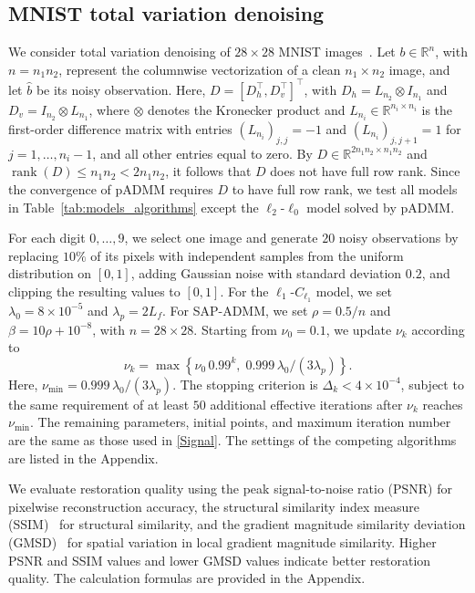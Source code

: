 \subsection{MNIST total variation denoising}

We consider total variation denoising of \(28\times28\)
MNIST images~\cite{LeCun1998}.
Let \(b\in\mathbb{R}^n\), with \(n=n_1n_2\), represent the
columnwise vectorization of a clean \(n_1\times n_2\) image,
and let \(\hat b\) be its noisy observation.
Here, \(D=[D_h^\top,D_v^\top]^\top\), with
\(D_h=L_{n_2}\otimes I_{n_1}\) and
\(D_v=I_{n_2}\otimes L_{n_1}\), where \(\otimes\) denotes the
Kronecker product and \(L_{n_i}\in\mathbb{R}^{n_i\times n_i}\)
is the first-order difference matrix with entries
\((L_{n_i})_{j,j}=-1\) and \((L_{n_i})_{j,j+1}=1\)
for \(j=1,\ldots,n_i-1\), and all other entries equal to zero.
By \(D\in\mathbb{R}^{2n_1n_2\times n_1n_2}\) and
\(\operatorname{rank}(D)\leq n_1n_2<2n_1n_2\), it follows
that \(D\) does not have full row rank.
Since the convergence of pADMM requires \(D\) to
have full row rank, we test all models in Table~\ref{tab:models_algorithms} except the $\ell_2$-$\ell_0$ model solved by pADMM.

For each digit \(0,\ldots,9\), we select one image and generate
\(20\) noisy observations by replacing \(10\%\) of its pixels
with independent samples from the uniform distribution on
\([0,1]\), adding Gaussian noise with standard deviation
\(0.2\), and clipping the resulting values to \([0,1]\).
For the \(\ell_1\)-\(C_{\ell_1}\) model, we set
\(\lambda_0=8\times10^{-5}\) and \(\lambda_p=2L_f\).
For SAP-ADMM, we set \(\rho=0.5/n\) and
\(\beta=10\rho+10^{-8}\), with \(n=28\times28\).
Starting from \(\nu_0=0.1\), we update \(\nu_k\) according to
\[
\nu_k
=
\max\left\{
\nu_0\,0.99^k,\;
0.999\,\lambda_0/(3\lambda_p)
\right\}.
\]
Here, \(\nu_{\min}=0.999\,\lambda_0/(3\lambda_p)\).
The stopping criterion is \(\Delta_k<4\times10^{-4}\), subject
to the same requirement of at least \(50\) additional effective
iterations after \(\nu_k\) reaches \(\nu_{\min}\).
The remaining parameters, initial points, and maximum iteration
number are the same as those used in \cref{Signal}.
The settings of the competing algorithms are listed in
the Appendix.

We evaluate restoration quality using the peak signal-to-noise
ratio (PSNR) for pixelwise reconstruction accuracy, the structural
similarity index measure (SSIM)~\cite{Wang2004} for structural
similarity, and the gradient magnitude similarity deviation
(GMSD)~\cite{Xue2014} for spatial variation in local gradient
magnitude similarity.
Higher PSNR and SSIM values and lower GMSD values indicate
better restoration quality.
The calculation formulas are provided in the Appendix.

